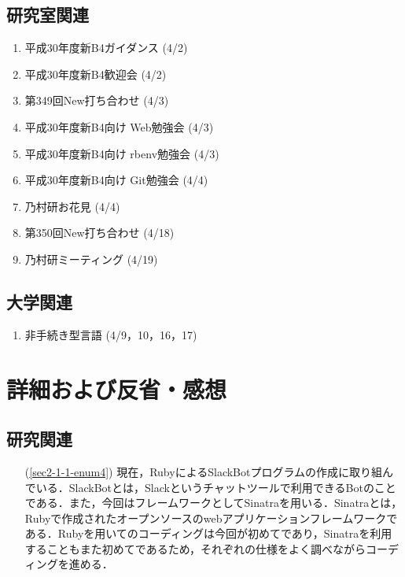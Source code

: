 \documentclass[fleqn, 14pt]{extarticle}
\begin{document}
\subsection{研究室関連}
\label{sec2-2}
\begin{enumerate}
\item 平成30年度新B4ガイダンス
  \hfill
  \label{sec2-2-enum1}
  (4/2)
\item 平成30年度新B4歓迎会
  \hfill
  \label{sec2-2-enum1}
  (4/2)
\item 第349回New打ち合わせ
  \hfill
  \label{sec2-2-enum2}
  (4/3)
\item 平成30年度新B4向け Web勉強会
  \hfill
  \label{sec2-2-enum3}
  (4/3)
\item 平成30年度新B4向け rbenv勉強会
  \hfill
  \label{sec2-2-enum4}
  (4/3)
\item 平成30年度新B4向け Git勉強会
  \hfill
  \label{sec2-2-enum5}
  (4/4)
\item 乃村研お花見
  \hfill
  \label{sec2-2-enum6}
  (4/4)
\item 第350回New打ち合わせ
  \hfill
  \label{sec2-2-enum6}
  (4/18)
\item 乃村研ミーティング
  \hfill
  \label{sec2-2-enum6}
  (4/19)
\end{enumerate}

\subsection{大学関連}
\label{sec2-3}
\begin{enumerate}
\item 非手続き型言語
  \hfill
  \label{sec2-3-enum1}
  (4/9，10，16，17)
\end{enumerate}

\section{詳細および反省・感想}
\label{sec3}
\subsection{研究関連}
\label{sec3-1}
\begin{itemize}
\item[(\ref{sec2-1-1-enum4})] 現在，RubyによるSlackBotプログラムの作成に取り組んでいる．SlackBotとは，Slackというチャットツールで利用できるBotのことである．また，今回はフレームワークとしてSinatraを用いる．Sinatraとは，Rubyで作成されたオープンソースのwebアプリケーションフレームワークである．Rubyを用いてのコーディングは今回が初めてであり，Sinatraを利用することもまた初めてであるため，それぞれの仕様をよく調べながらコーディングを進める．
\end{itemize}
\end{document}
